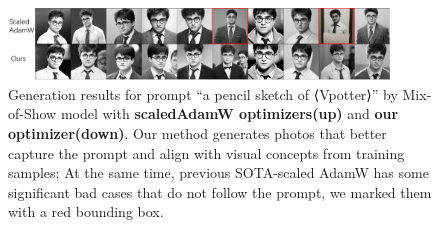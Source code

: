 \begin{table}[!ht]
\centering
\small %
\setlength{\tabcolsep}{6pt} %
\renewcommand{\arraystretch}{1.3} %
\caption
{We maintain the same settings as in Table~\ref{table:llm_profiled_performance}. We ensure a comparable memory footprint to SGDM, while keeping the optimizer step time controlled, resulting in a performance that is \textbf{4-6 x faster than} Adam-mini.}
\label{table:vit_profiled_performance}
\end{table}

\begin{figure}[!ht]
    \centering
    \includegraphics[width=0.9\textwidth]{images/mixofshow.pdf}     
    \caption{Generation results for prompt “a pencil sketch of ⟨Vpotter⟩” by Mix-of-Show model with \textbf{scaledAdamW optimizers(up)} and \textbf{our optimizer(down)}. Our method generates photos that better capture the prompt and align with visual concepts from training samples; At the same time, previous SOTA-scaled AdamW has some significant bad cases that do not follow the prompt, we marked them with a red bounding box.}
    \label{fig:mix_of_show}
    \vspace{-3mm}
\end{figure}


